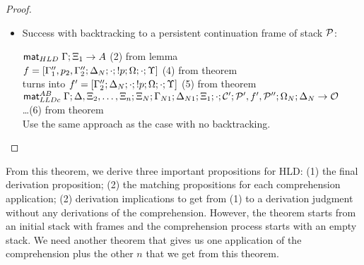 \begin{proof}
\begin{itemize}[leftmargin=*]
   \item Success with backtracking to a persistent continuation frame of stack
   $\mathcal{P}$:

      $\mathsf{mat}_{HLD} \; \Gamma; \Xi_1 \rightarrow A$ \hfill (2) from lemma \\

      $f = [\Gamma''_1, p_2, \Gamma''_2; \Delta_N; \cdot; {!} p; \Omega; \cdot; \Upsilon]$ \hfill (4) from theorem \\
      turns into $f' = [\Gamma''_2; \Delta_N; \cdot; {!} p; \Omega; \cdot;
      \Upsilon]$ \hfill (5) from theorem \\

      $\mathsf{mat}_{LLDc}^{AB} \; \Gamma; \Delta, \Xi_2, \dotsc, \Xi_n; \Xi_N; \Gamma_{N1};
\Delta_{N1}; \Xi_1; \cdot; \mathcal{C'}; \mathcal{P'}, f', \mathcal{P''}; \Omega_N; \Delta_N \rightarrow
\mathcal{O}$ \\ \dots \hfill (6) from theorem \\
         
      Use the same approach as the case with no backtracking.
      
\end{itemize}
\end{proof}

From this theorem, we derive three important propositions for HLD: (1) the final
derivation proposition; (2) the matching propositions for each comprehension
application; (2) derivation implications to get from (1) to a derivation
judgment without any derivations of the comprehension. However, the theorem
starts from an initial stack with frames and the comprehension process starts
with an empty stack. We need another theorem that gives us one application of
the comprehension plus the other $n$ that we get from this theorem.

